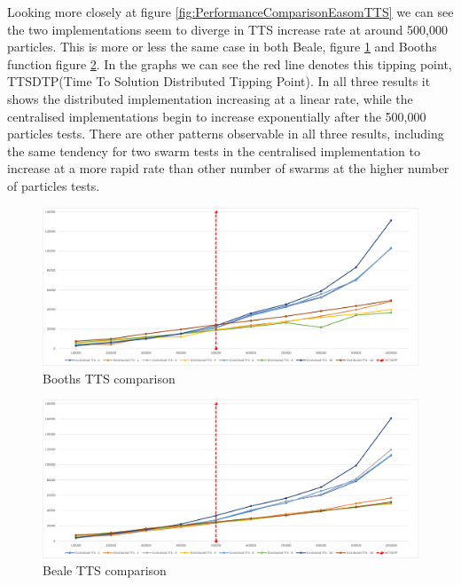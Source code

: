 \documentclass[oneside,12pt]{book}
\begin{document}
Looking more closely at figure \ref{fig:PerformanceComparisonEasomTTS} we can see the two implementations seem to diverge in TTS increase rate at around 500,000 particles. This is more or less the same case in both Beale, figure \ref{fig:PerformanceComparisonBoothsTTS} and Booths function figure \ref{fig:PerformanceComparisonBealeTTS}. In the graphs we can see the red line denotes this tipping point, TTSDTP(Time To Solution Distributed Tipping Point). In all three results it shows the distributed implementation increasing at a linear rate, while the centralised implementations begin to increase exponentially after the 500,000 particles tests. There are other patterns observable in all three results, including the same tendency for two swarm tests in the centralised implementation to increase at a more rapid rate than other number of swarms at the higher number of particles tests. 

\begin{figure}[H]
    \centering
    \includegraphics[scale=0.45]{Images/Graphs/PerformanceComparisonBoothsTTS.png}
    \caption{Booths TTS comparison}
    \label{fig:PerformanceComparisonBoothsTTS}
\end{figure}

\begin{figure}[H]
    \centering
    \includegraphics[scale=0.45]{Images/Graphs/PerformanceComparisonBealeTTS.png}
    \caption{Beale TTS comparison}
    \label{fig:PerformanceComparisonBealeTTS}
\end{figure}
\end{document}
